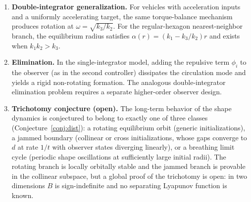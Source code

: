 \begin{enumerate}[leftmargin=2.5em]
        finite-precision noise does break the reflection symmetry and the chosen sense persists, but
        over $6000$\,s that run does not settle onto a rigid rotation---it remains in a bounded,
        irregularly circulating, non-rigid state, so the symmetric manifold appears only weakly
        repelling. Whether it eventually reaches one of the two mirror limit cycles is open.
  \item \textbf{Double-integrator generalization.} For vehicles with acceleration inputs and a
        uniformly accelerating target, the same torque-balance mechanism produces rotation at
        $\omega=\sqrt{k_3/k_2}$. For the regular-hexagon nearest-neighbor branch, the equilibrium
        radius satisfies $\alpha(r)=(k_1-k_3/k_2)r$ and exists when $k_1k_2>k_3$.
  \item \textbf{Elimination.} In the single-integrator model, adding the repulsive term $\phi_i$ to
        the observer (as in the second controller) dissipates the circulation mode and yields a rigid
        non-rotating formation. The analogous double-integrator elimination problem requires a
        separate higher-order observer design.
  \item \textbf{Trichotomy conjecture (open).} The long-term behavior of the shape dynamics is
        conjectured to belong to exactly one of three classes (Conjecture~\ref{conj:dist}):
        a rotating equilibrium orbit (generic initializations), a jammed boundary (collinear or cross
        initializations, whose gaps converge to $d$ at rate $1/t$ with observer states diverging
        linearly), or a breathing limit cycle (periodic shape oscillations at sufficiently large
        initial radii). The rotating branch is locally orbitally stable and the jammed branch is
        provable in the collinear subspace, but a global proof of the trichotomy is open: in two
        dimensions $B$ is sign-indefinite and no separating Lyapunov function is known.
\end{enumerate}

